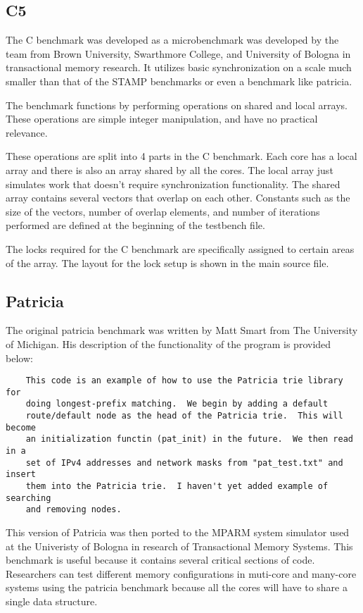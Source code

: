 \documentclass{article}
\begin{document}
\subsection{C5}

The C benchmark was developed as a microbenchmark was developed by the team
from Brown University, Swarthmore College, and University of Bologna in 
transactional memory research. It utilizes basic synchronization on a scale 
much smaller than that of the STAMP benchmarks or even a benchmark like 
patricia.

The benchmark functions by performing operations on shared and local arrays. 
These operations are simple integer manipulation, and have no practical 
relevance. 

These operations are split into 4 parts in the C benchmark. Each core has a 
local array and there is also an array shared by all the cores. The local 
array just simulates work that doesn't require synchronization functionality. 
The shared array contains several vectors that overlap on each other. 
Constants such as the size of the vectors, number of overlap elements, and 
number of iterations performed are defined at the beginning of the testbench
 file. 

The locks required for the C benchmark are specifically assigned to certain 
areas of the array. The layout for the lock setup is shown in the main source 
file.

\subsection{Patricia}

The original patricia benchmark was written by Matt Smart from The University of
 Michigan. His description of the functionality of the program is provided
below:

\begin{verbatim}
    This code is an example of how to use the Patricia trie library for
    doing longest-prefix matching.  We begin by adding a default
    route/default node as the head of the Patricia trie.  This will become
    an initialization functin (pat_init) in the future.  We then read in a
    set of IPv4 addresses and network masks from "pat_test.txt" and insert
    them into the Patricia trie.  I haven't yet added example of searching
    and removing nodes.
\end{verbatim}

This version of Patricia was then ported to the MPARM system simulator used at 
the Univeristy of Bologna in research of Transactional Memory Systems. This
benchmark is useful because it contains several critical sections of code. 
Researchers can test different memory configurations in muti-core and many-core 
systems using the patricia benchmark because all the cores will have to share a 
single data structure. 
\end{document}
